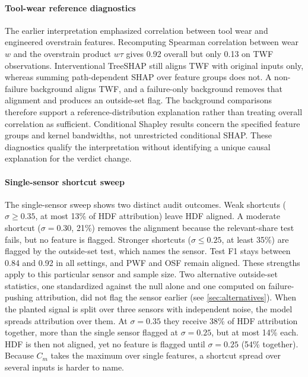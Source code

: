 \documentclass[10pt]{article}
\begin{document}
\paragraph{Tool-wear reference diagnostics} The earlier interpretation emphasized correlation between tool wear and engineered overstrain features. Recomputing Spearman correlation between wear $w$ and the overstrain product $w\tau$ gives 0.92 overall but only 0.13 on TWF observations. Interventional TreeSHAP still aligns TWF with original inputs only, whereas summing path-dependent SHAP over feature groups does not. A non-failure background aligns TWF, and a failure-only background removes that alignment and produces an outside-set flag. The background comparisons therefore support a reference-distribution explanation rather than treating overall correlation as sufficient. Conditional Shapley results concern the specified feature groups and kernel bandwidths, not unrestricted conditional SHAP. These diagnostics qualify the interpretation without identifying a unique causal explanation for the verdict change.

\paragraph{Single-sensor shortcut sweep} The single-sensor sweep shows two distinct audit outcomes. Weak shortcuts ($\sigma\geq0.35$, at most 13\% of HDF attribution) leave HDF aligned. A moderate shortcut ($\sigma=0.30$, 21\%) removes the alignment because the relevant-share test fails, but no feature is flagged. Stronger shortcuts ($\sigma\leq0.25$, at least 35\%) are flagged by the outside-set test, which names the sensor. Test F1 stays between 0.84 and 0.92 in all settings, and PWF and OSF remain aligned. These strengths apply to this particular sensor and sample size. Two alternative outside-set statistics, one standardized against the null alone and one computed on failure-pushing attribution, did not flag the sensor earlier (see \cref{sec:alternatives}). When the planted signal is split over three sensors with independent noise, the model spreads attribution over them. At $\sigma=0.35$ they receive 38\% of HDF attribution together, more than the single sensor flagged at $\sigma=0.25$, but at most 14\% each. HDF is then not aligned, yet no feature is flagged until $\sigma=0.25$ (54\% together). Because $C_m$ takes the maximum over single features, a shortcut spread over several inputs is harder to name.
\end{document}
